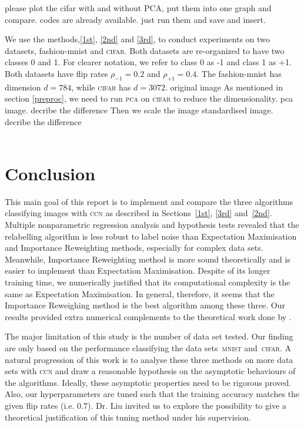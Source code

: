 \documentclass[12pt]{article} %
\newcommand{\rhoo}{\rho_{+1}}
\newcommand{\rhoz}{\rho_{-1}}
\begin{document}
{\color{red} please plot the cifar with and without PCA, put them into one graph and compare. codes are already available. just run them and save and insert.}

We use the methods,\ref{1st}, \ref{2nd} and \ref{3rd}, to conduct experiments on two datasets, fashion-mnist and \textsc{cifar}.
Both datasets are re-organized to have two classes 0 and 1.
For clearer notation, we refer to class 0 as -1 and class 1 as +1.
Both datasets have flip rates $\rhoz=0.2$ and $\rhoo=0.4$.
The fashion-mnist has dimension $d=784$, while \textsc{cifar} has $d=3072$.
{\color{red} original image}
As mentioned in section \ref{preproc}, we need to run \textsc{pca} on \textsc{cifar} to reduce the dimensionality.
{\color{red} pca image. decribe the difference}
Then we scale the image
{\color{red} standardised image. decribe the difference} \\ \\


\section{Conclusion}
This main goal of this report is to implement and compare the three algorithms classifying images with \textsc{ccn} as described in Sections~\ref{1st}, \ref{3rd} and~\ref{2nd}. 
Multiple nonparametric regression analysis and hypothesis tests revealed that the relabelling algorithm is less robust to label noise than Expectation Maximisation and Importance Reweighting methods, especially for complex data sets. Meanwhile, Importance Reweighting method is more sound theoretically \citep{liu2016classification} and is easier to implement than Expectation Maximisation. 
Despite of its longer training time, we numerically justified that its computational complexity is the same as Expectation Maximisation.
In general, therefore, it seems that the Importance Reweighing method is the best algorithm among these three. 
Our results provided extra numerical complements to the theoretical work done by \citet{liu2016classification}. 

The major limitation of this study is the number of data set tested. Our finding are only based on the performance classifying the data sets~\textsc{mnist} and~\textsc{cifar}. A natural progression of this work is to analyse these three methods on more data sets with \textsc{ccn} and draw a reasonable hypothesis on the asymptotic behaviours of the algorithms. Ideally, these asymptotic properties need to be rigorous proved. Also, our hyperparameters are tuned such that the training accuracy matches the given flip rates (i.e. $0.7$). Dr. Liu invited us to explore the possibility to give a theoretical justification of this tuning method under his supervision.
\label{headings}



\end{document}
